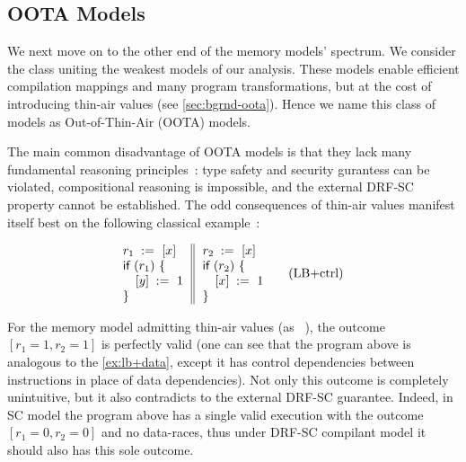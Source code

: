 \subsection{OOTA Models}

We next move on to the other end of the memory models' spectrum. 
We consider the class uniting the weakest models of our analysis.
These models enable efficient compilation mappings and 
many program transformations, but at the cost of 
introducing thin-air values (see \cref{sec:bgrnd-oota}).
Hence we name this class of models as Out-of-Thin-Air (OOTA) models. 
 
The main common disadvantage of OOTA models is that 
they lack many fundamental reasoning 
principles~\cite{Boehm-Demsky:MSPC14, Batty-al:ESOP15}:
type safety and security gurantess can be violated, 
compositional reasoning is impossible, and
the external DRF-SC property cannot be established. 
The odd consequences of thin-air values manifest 
itself best on the following classical example~\cite{Boehm-Demsky:MSPC14}: 

\begin{equation*}
\inarrII{
  \readInst{}{r_1}{x}      \\
  \kw{if} {(r_1)} ~\{      \\
  \quad\writeInst{}{y}{1}  \\
  \}
}{
  \readInst{}{r_2}{x}      \\
  \kw{if} {(r_2)} ~\{      \\
  \quad\writeInst{}{x}{1}  \\
  \}
}
\tag{LB+ctrl}\label{ex:lb+ctrl}
\end{equation*}

For the memory model admitting thin-air values 
(as \eg \CMM~\cite{Batty-al:POPL11}), 
the outcome $[r_1=1, r_2=1]$ is perfectly valid
(one can see that the program above is analogous 
to the \ref{ex:lb+data}, except it has 
control dependencies between instructions 
in place of data dependencies).
Not only this outcome is completely unintuitive,
but it also contradicts to the external DRF-SC guarantee.
Indeed, in SC model the program above has 
a single valid execution with the outcome $[r_1=0, r_2=0]$ 
and no data-races, thus under DRF-SC compilant model 
it should also has this sole outcome.  

